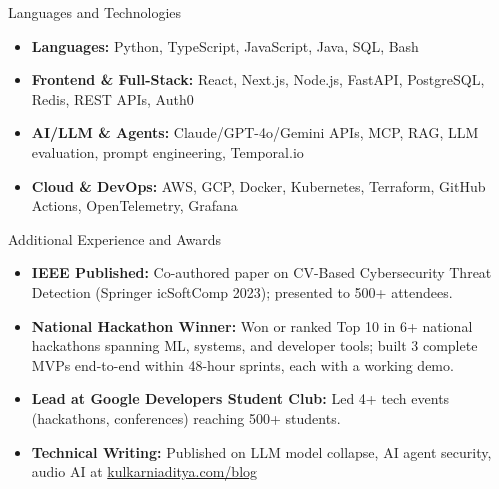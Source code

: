\documentclass[]{mcdowellcv}
\begin{document}
\begin{cvsection}{Languages and Technologies}
  \begin{cvsubsection}{}{}{}
    \begin{itemize}
      \item \textbf{Languages:} Python, TypeScript, JavaScript, Java, SQL, Bash
      \item \textbf{Frontend \& Full-Stack:} React, Next.js, Node.js, FastAPI, PostgreSQL, Redis, REST APIs, Auth0
      \item \textbf{AI/LLM \& Agents:} Claude/GPT-4o/Gemini APIs, MCP, RAG, LLM evaluation, prompt engineering, Temporal.io
      \item \textbf{Cloud \& DevOps:} AWS, GCP, Docker, Kubernetes, Terraform, GitHub Actions, OpenTelemetry, Grafana
    \end{itemize}
  \end{cvsubsection}
\end{cvsection}

\begin{cvsection}{Additional Experience and Awards}
  \begin{cvsubsection}{}{}{}
    \begin{itemize}
      \item \textbf{IEEE Published:} Co-authored paper on CV-Based Cybersecurity Threat Detection (Springer icSoftComp 2023); presented to 500+ attendees.
      \item \textbf{National Hackathon Winner:} Won or ranked Top 10 in 6+ national hackathons spanning ML, systems, and developer tools; built 3 complete MVPs end-to-end within 48-hour sprints, each with a working demo.
      \item \textbf{Lead at Google Developers Student Club:} Led 4+ tech events (hackathons, conferences) reaching 500+ students.
      \item \textbf{Technical Writing:} Published on LLM model collapse, AI agent security, audio AI at \href{https://www.kulkarniaditya.com/blog}{kulkarniaditya.com/blog}
    \end{itemize}
  \end{cvsubsection}
\end{cvsection}
\end{document}
